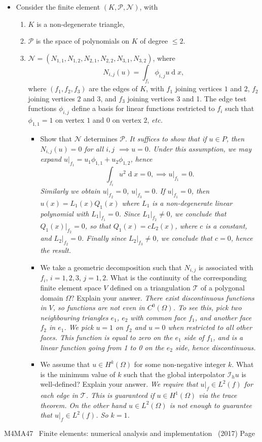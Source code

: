 \documentclass[12pt]{article}
\newcommand{\coursenum}{M4MA47} %
\newcommand{\coursename}{Finite elements: numerical analysis and implementation} %
\newcommand{\examyear}{2017}
\newenvironment{Question}[1] 
 {\begin{itemize} \item[\large #1.~~]}{\end{itemize} \medskip}
\newcommand{\EndPage}{
	\vfill \coursenum ~ \coursename ~
	(\examyear) \hfill Page \thepage \newpage
	}
\newcommand{\BeginParts}{\begin{itemize}}
\newcommand{\Part}[1]{\item [(#1)~~]}
\newcommand{\EndParts}{\end{itemize}}
\DeclareMathOperator{\diff}{d}
\newcommand{\soln}[1]{\newline \noindent {\bfseries Solution:} {\itshape \color{blue} #1}}
\newcommand{\soln}[1]{}
\begin{document}
\begin{Question}{4}
Consider the finite element $(K,\mathcal{P},\mathcal{N})$, with 
\begin{enumerate}
\item $K$ is a non-degenerate triangle,
\item $\mathcal{P}$ is the space of polynomials on $K$ of degree $\leq 2$.
\item $\mathcal{N}=(N_{1,1},N_{1,2},N_{2,1},N_{2,2},N_{3,1},N_{3,2})$,
where 
\[
N_{i,j}(u)= \int_{f_i}\phi_{i,j} u\diff x,
\]
where $(f_1,f_2,f_3)$ are the edges of $K$, with $f_1$ joining
vertices $1$ and $2$, $f_2$ joining vertices $2$ and $3$, and $f_3$
joining vertices 3 and 1. The edge test functions $\phi_{i,j}$ define
a basis for linear functions restricted to $f_i$ such that $\phi_{1,1}=1$
on vertex $1$ and 0 on vertex $2$, \emph{etc.}
 \BeginParts
 \Part{a} Show that $\mathcal{N}$ determines $\mathcal{P}$. 
 \soln{It suffices to show that if $u \in P$, then
 $N_{i,j}(u)=0$ for all $i,j$ $\implies u=0$. Under this assumption,
 we may expand $u|_{f_1} = u_1\phi_{1,1}+u_2\phi_{1,2}$, hence
 \[
 \int_{f_i}u^2 \diff x = 0, \implies u|_{f_1}=0.
 \]
Similarly we obtain $u|_{f_2}=0$, $u|_{f_3}=0$.
If $u|_{f_1}=0$, then $u(x)=L_1(x)Q_1(x)$ where $L_1$ is a non-degenerate
 linear polynomial with $L_1|_{f_1}=0$.
Since $L_1|_{f_2}\ne 0$, we
 conclude that $Q_1(x)|_{f_2}=0$, so that $Q_1(x)=cL_2(x)$, where $c$
 is a constant, and $L_2|_{f_2}=0$. Finally since $L_2|_{f_3}\ne 0$, 
 we conclude that $c=0$, hence the result.}
 \Part{b} We take a geometric decomposition such that $N_{i,j}$ is 
associated with $f_i$, $i=1,2,3$, $j=1,2$. What is the continuity of the
corresponding finite element space $V$ defined on a triangulation $\mathcal{T}$
of a polygonal domain $\Omega$? Explain your answer.
\soln{ There exist discontinuous functions in $V$, so functions are
  not even in $C^0(\Omega)$. To see this, pick two neighbouring
  triangles $e_1$, $e_2$ with common face $f_1$, and another face
$f_2$ in $e_1$. We pick $u=1$ on $f_2$ and $u=0$ when restricted to 
all other faces. This function is equal to zero on the $e_1$ side of $f_1$,
and is a linear function going from 1 to 0 on the $e_2$ side, hence
discontinuous.
}
\Part{c} We assume that $u\in H^k(\Omega)$ for some non-negative integer $k$.
What is the minimum value of $k$ such that the global interpolator
$\mathcal{I}_hu$ is well-defined? Explain your answer.
\soln{
We require that $u|_f \in L^2(f)$ for each edge in $\mathcal{T}$. This
is guaranteed if $u \in H^1(\Omega)$ via the trace theorem. On the other
hand $u\in L^2(\Omega)$ is not enough to guarantee that $u|_f\in L^2(f)$.
So $k=1$.
}
 \EndParts
\end{enumerate}

\end{Question}



\label{ptotal}
\EndPage
\end{document}

